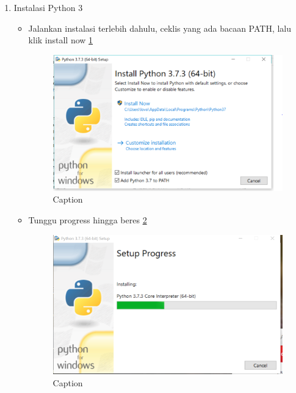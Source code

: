 \begin{enumerate}
    \item Instalasi Python 3
    \begin{itemize}
        \item Jalankan instalasi terlebih dahulu, ceklis yang ada bacaan PATH, lalu klik install now \ref{proses1}
        \begin{figure} [h]
            \centering
            \includegraphics[scale=0.5]{figures/Capture1.PNG}
            \caption{Caption}
            \label{proses1}
        \end{figure}
        
        \item Tunggu progress hingga beres \ref{proses2}
        \begin{figure} [h]
            \centering
            \includegraphics[scale=0.5]{figures/Capture2.PNG}
            \caption{Caption}
            \label{proses2}
        \end{figure}
        

\end{itemize}
\end{enumerate}
